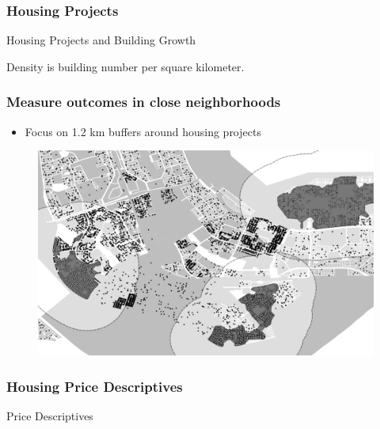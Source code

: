\documentclass[aspectratio=149]{beamer}
\begin{document}

\begin{frame}
\frametitle{Housing Projects}
\begin{table}
\caption{Housing Projects and Building Growth}

\end{table}
\vspace{.2cm} 
Density is building number per square kilometer.
\end{frame}


\begin{frame}
\frametitle{Measure outcomes in close neighborhoods}
\begin{itemize}
  \item Focus on 1.2 km buffers around housing projects
\end{itemize}
\begin{center}
\begin{figure}
\includegraphics[scale=0.30]{design2.png}
\vspace{-3mm}
\end{figure}
\end{center}
\end{frame}


\begin{frame}
\frametitle{Housing Price Descriptives}
\begin{table}
\caption{Price Descriptives}
\centering
\resizebox{.95\textwidth}{!}{  

}
\end{table}
\end{frame}
\end{document}
